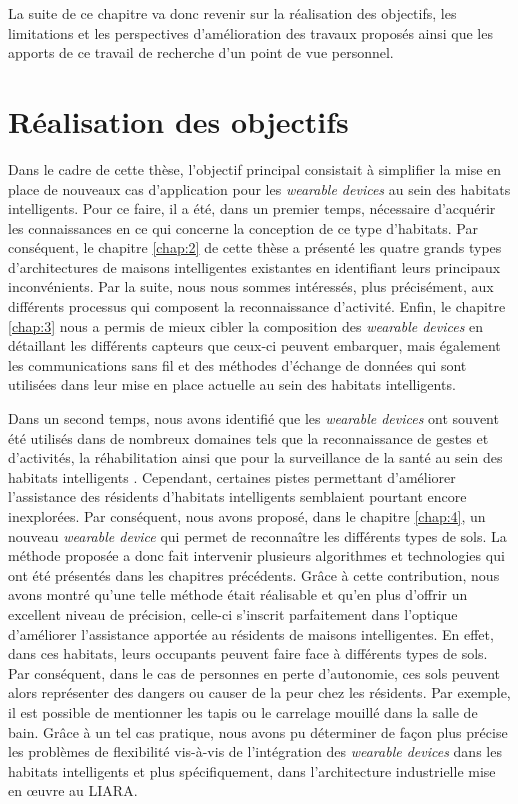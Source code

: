 La suite de ce chapitre va donc revenir sur la réalisation des objectifs, les limitations et les perspectives d’amélioration des travaux proposés ainsi que les apports de ce travail de recherche d’un point de vue personnel.

\section{Réalisation des objectifs}

Dans le cadre de cette thèse, l'objectif principal consistait à simplifier la mise en place de nouveaux cas d'application pour les \textit{wearable devices} au sein des habitats intelligents. Pour ce faire, il a été, dans un premier temps, nécessaire d'acquérir les connaissances en ce qui concerne la conception de ce type d'habitats. Par conséquent, le chapitre \ref{chap:2} de cette thèse a présenté les quatre grands types d'architectures de maisons intelligentes existantes en identifiant leurs principaux inconvénients. Par la suite, nous nous sommes intéressés, plus précisément, aux différents processus qui composent la reconnaissance d'activité. Enfin, le chapitre \ref{chap:3} nous a permis de mieux cibler la composition des \textit{wearable devices} en détaillant les différents capteurs que ceux-ci peuvent embarquer, mais également les communications sans fil et des méthodes d'échange de données qui sont utilisées dans leur mise en place actuelle au sein des habitats intelligents.

Dans un second temps, nous avons identifié que les \textit{wearable devices} ont souvent été utilisés dans de nombreux domaines tels que la reconnaissance de gestes et d’activités, la réhabilitation ainsi que pour la surveillance de la santé au sein des habitats intelligents \citep{Khan2016,Davis2016,Chapron2018}. Cependant, certaines pistes permettant d’améliorer l’assistance des résidents d’habitats intelligents semblaient pourtant encore inexplorées. Par conséquent, nous avons proposé, dans le chapitre \ref{chap:4}, un nouveau \textit{wearable device} qui permet de reconnaître les différents types de sols. La méthode proposée a donc fait intervenir plusieurs algorithmes et technologies qui ont été présentés dans les chapitres précédents. Grâce à cette contribution, nous avons montré qu'une telle méthode était réalisable et qu'en plus d'offrir un excellent niveau de précision, celle-ci s'inscrit parfaitement dans l'optique d'améliorer l'assistance apportée au résidents de maisons intelligentes. En effet, dans ces habitats, leurs occupants peuvent faire face à différents types de sols. Par conséquent, dans le cas de personnes en perte d'autonomie, ces sols peuvent alors représenter des dangers ou causer de la peur chez les résidents. Par exemple, il est possible de mentionner les tapis ou le carrelage mouillé dans la salle de bain. Grâce à un tel cas pratique, nous avons pu déterminer de façon plus précise les problèmes de flexibilité vis-à-vis de l'intégration des \textit{wearable devices} dans les habitats intelligents et plus spécifiquement, dans l'architecture industrielle mise en \oe{}uvre au \ac{LIARA}.

